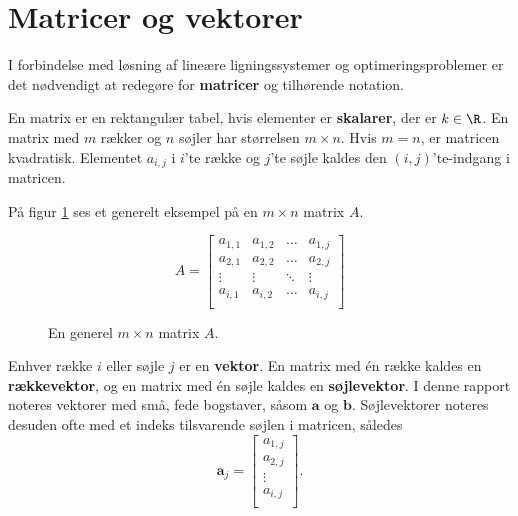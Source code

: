 \section{Matricer og vektorer}
%  
%
I forbindelse med løsning af lineære ligningssystemer og optimeringsproblemer er det nødvendigt at redegøre for \textbf{matricer} og tilhørende notation. 
%
\begin{defn}{}{}
En matrix er en rektangulær tabel, hvis elementer er \textbf{skalarer}, der er $k \in \R$. 
En matrix med $m$ rækker og $n$ søjler har størrelsen $m \times n$.
Hvis $m=n$, er matricen kvadratisk. 
Elementet $a_{i,j}$ i $i$'te række og $j$'te søjle kaldes den $(i,j)$'te-indgang i matricen. 
\end{defn}
\noindent
%
På figur \ref{fig:matrix_gen_eks} ses et generelt eksempel på en $m \times n$ matrix $A$.
%
\begin{figure}[H]
	\begin{center}
$$
A=
\begin{bmatrix}
a_{1,1} & a_{1,2} & \ldots & a_{1,j} \\
a_{2,1} & a_{2,2} & \ldots & a_{2,j} \\
\vdots  & \vdots  & \ddots & \vdots \\
a_{i,1} & a_{i,2} & \ldots & a_{i,j} \\
\end{bmatrix}
$$
	\end{center}
	\caption{En generel $m \times n$ matrix $A$.}
	\label{fig:matrix_gen_eks}
\end{figure}
\noindent
%
Enhver række $i$ eller søjle $j$ er en \textbf{vektor}. 
En matrix med én række kaldes en \textbf{rækkevektor}, og en matrix med én søjle kaldes en \textbf{søjlevektor}. 
I denne rapport noteres vektorer med små, fede bogstaver, såsom $\textbf{a}$ og $\textbf{b}$. 
Søjlevektorer noteres desuden ofte med et indeks tilsvarende søjlen i matricen, således 
%
$$
\textbf{a}_j= 
\begin{bmatrix}
a_{1,j} \\
a_{2,j} \\
\vdots \\
a_{i,j} \\
\end{bmatrix}.
$$ 